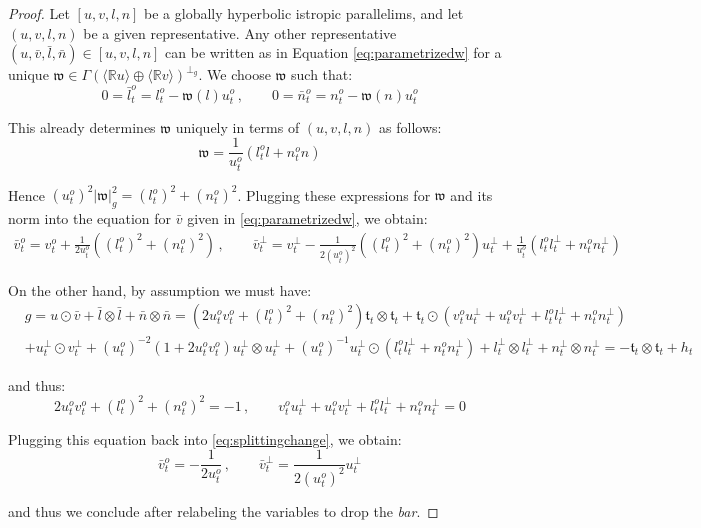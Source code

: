 \documentclass[10pt,reqno,a4paper]{amsart}
\theoremstyle{plain}
\theoremstyle{definition}
\theoremstyle{remark}
\theoremstyle{remark}
\newcommand{\frt}{\mathfrak{t}}
\def\frw{\mathfrak{w}}
\renewcommand{\(}{ (}
\renewcommand{\)}{ )}
\begin{document}
\begin{proof}
Let $[u,v,l,n]$ be a globally hyperbolic istropic parallelims, and let $(u,v,l,n)$ be a given representative. Any other representative $(u,\bar{v},\bar{l},\bar{n}) \in [u,v,l,n]$ can be written as in Equation \eqref{eq:parametrizedw} for a unique $\frw\in\Gamma (\langle \mathbb{R} u\rangle \oplus \langle \mathbb{R} v\rangle)^{\perp_g}$. We choose $\frw$ such that:
\begin{equation*}
0 = \bar{l}_t^{o} = l^o_t - \frw(l) u^o_t\, , \qquad 0 = \bar{n}_t^{o} = n^o_t - \frw(n) u^o_t
\end{equation*}

\noindent
This already determines $\frw$ uniquely in terms of $(u,v,l,n)$  as follows:
\begin{equation*}
\frw = \frac{1}{u^o_t} (l^o_t l + n^o_t n)
\end{equation*}

\noindent
Hence $(u^o_t)^2 \vert \frw \vert_g^2 =  (l^o_t)^2   + (n^o_t)^2$. Plugging these expressions for $\frw$ and its norm into the equation for $\bar{v}$ given in \eqref{eq:parametrizedw}, we obtain:
\begin{eqnarray}
\label{eq:splittingchange}
\bar{v}^o_t = v^o_t + \frac{1}{2  u^o_t} ((l^o_t)^2   + (n^o_t)^2)  \, , \qquad \bar{v}^{\perp}_t = v^{\perp}_t - \frac{1}{2 (u^o_t)^2}((l^o_t)^2   + (n^o_t)^2) u^{\perp}_t + \frac{1}{u^o_t} (l^o_t l^{\perp}_t + n^o_t n^{\perp}_t)
\end{eqnarray}

\noindent
On the other hand, by assumption we must have:
\begin{eqnarray*}
& g = u\odot \bar{v}  + \bar{l}\otimes \bar{l} + \bar{n}\otimes \bar{n}  = (2 u^o_t v^o_t + (l^o_t)^2 + (n^o_t)^2) \frt_t\otimes \frt_t + \frt_t \odot (v^o_t u^{\perp}_t + u^o_t v^{\perp}_t + l^o_t l^{\perp}_t + n^o_t n^{\perp}_t)\\
& + u^{\perp}_t \odot v^{\perp}_t + (u^o_t)^{-2} (1 + 2 u^o_t v^o_t) u^{\perp}_t\otimes u^{\perp}_t + (u^o_t)^{-1} u^{\perp}_t\odot (l^o_t l^{\perp}_t + n^o_t n^{\perp}_t) + l^{\perp}_t \otimes l^{\perp}_t + n^{\perp}_t \otimes n^{\perp}_t = - \frt_t\otimes \frt_t + h_t
\end{eqnarray*}

\noindent
and thus:
\begin{equation*}
2 u^o_t v^o_t + (l^o_t)^2 + (n^o_t)^2 = -1\, , \qquad v^o_t u^{\perp}_t + u^o_t v^{\perp}_t + l^o_t l^{\perp}_t + n^o_t n^{\perp}_t = 0
\end{equation*}

\noindent
Plugging this equation back into \eqref{eq:splittingchange}, we obtain:
\begin{equation*}
\bar{v}^o_t = -  \frac{1}{2  u^o_t} \, , \qquad \bar{v}^{\perp}_t =  \frac{1}{2 (u^o_t)^2}  u^{\perp}_t  
\end{equation*}

\noindent
and thus we conclude after relabeling the variables to drop the \emph{bar}. 
\end{proof}
\end{document}
